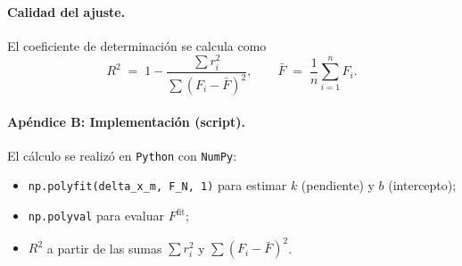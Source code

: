 \documentclass[11pt,twocolumn]{article}
\begin{document}
\paragraph{Calidad del ajuste.}
El coeficiente de determinación se calcula como
\[
R^2 \;=\; 1 - \frac{\sum r_i^2}{\sum (F_i-\bar F)^2},
\qquad 
\bar F \;=\; \frac{1}{n}\sum_{i=1}^n F_i.
\]

\paragraph{Apéndice B: Implementación (script).}
El cálculo se realizó en \texttt{Python} con \texttt{NumPy}:
\begin{itemize}[leftmargin=*,itemsep=2pt,topsep=2pt]
    \item \texttt{np.polyfit(delta\_x\_m, F\_N, 1)} para estimar $k$ (pendiente) y $b$ (intercepto);
    \item \texttt{np.polyval} para evaluar $F^{\text{fit}}$;
    \item $R^2$ a partir de las sumas $\sum r_i^2$ y $\sum (F_i-\bar F)^2$.
\end{itemize}


\printbibliography
\end{document}
